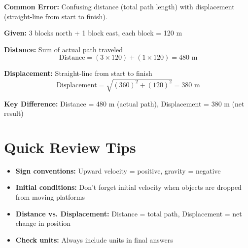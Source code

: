 \documentclass[12pt]{article}
\begin{document}
\textbf{Common Error:} Confusing distance (total path length) with displacement (straight-line from start to finish).

\textbf{Given:} 3 blocks north + 1 block east, each block = 120 m

\textbf{Distance:} Sum of actual path traveled
$$\text{Distance} = (3 \times 120) + (1 \times 120) = 480 \text{ m}$$

\textbf{Displacement:} Straight-line from start to finish
$$\text{Displacement} = \sqrt{(360)^2 + (120)^2} = 380 \text{ m}$$

\textbf{Key Difference:} Distance = 480 m (actual path), Displacement = 380 m (net result)

\section{Quick Review Tips}

\begin{itemize}
\item \textbf{Sign conventions:} Upward velocity = positive, gravity = negative
\item \textbf{Initial conditions:} Don't forget initial velocity when objects are dropped from moving platforms
\item \textbf{Distance vs. Displacement:} Distance = total path, Displacement = net change in position
\item \textbf{Check units:} Always include units in final answers
\end{itemize}
\end{document}
